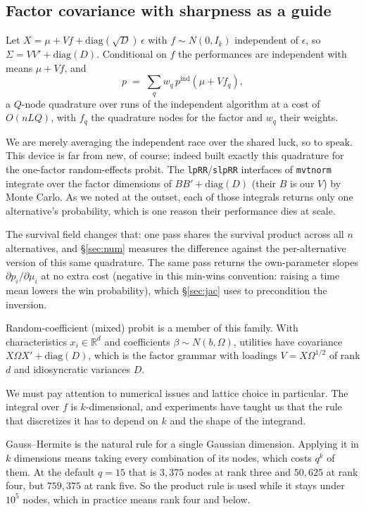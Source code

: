 \documentclass[11pt]{article}
\newcommand{\R}{\mathbb{R}}
\begin{document}
\subsection{Factor covariance with sharpness as a guide}\label{sec:factor}

Let $X=\mu+Vf+\mathrm{diag}(\sqrt D)\,\epsilon$ with $f\sim N(0,I_k)$
independent of $\epsilon$, so $\Sigma=VV'+\mathrm{diag}(D)$. Conditional on $f$
the performances are independent with means $\mu+Vf$, and
\begin{equation}
p \;=\; \sum_q w_q\, p^{\mathrm{ind}}(\mu+Vf_q),
\end{equation}
a $Q$-node quadrature over runs of the independent algorithm at a cost of
$O(nLQ)$, with $f_q$ the quadrature nodes for the factor and $w_q$ their
weights.

We are merely averaging the independent race over the shared luck, so to speak. This device is far from new, of course; indeed
\citet{butler1982} built exactly this quadrature for the one-factor
random-effects probit. The \texttt{lpRR}/\texttt{slpRR} interfaces of
\texttt{mvtnorm} integrate over the factor dimensions of
$BB'+\mathrm{diag}(D)$ (their $B$ is our $V$) by Monte Carlo. As we noted at the outset, each of
those integrals returns only one alternative's probability, which is one
reason their performance dies at scale.

The survival field changes that: one pass shares the survival product across all
$n$ alternatives, and \S\ref{sec:num} measures the difference against the
per-alternative version of this same quadrature. The same pass returns the own-parameter slopes $\partial p_i/\partial\mu_i$
at no extra cost (negative in this min-wins convention: raising a time
mean lowers the win probability), which \S\ref{sec:jac} uses to
precondition the inversion.

Random-coefficient (mixed) probit is a member of this family. With
characteristics $x_i\in\R^{d}$ and coefficients
$\beta\sim N(b,\Omega)$, utilities have covariance
$X\Omega X'+\mathrm{diag}(D)$, which is the factor grammar with loadings
$V=X\Omega^{1/2}$ of rank $d$ and idiosyncratic variances $D$.

We must pay attention to numerical issues and lattice choice in particular. The integral over $f$ is $k$-dimensional, and experiments have taught us that the rule that discretizes it
has to depend on $k$ and the shape of the integrand.

Gauss--Hermite is the natural rule for a single Gaussian dimension.
Applying it in $k$ dimensions means taking every combination of its
nodes, which costs $q^{k}$ of them. At the default $q=15$ that is
$3{,}375$ nodes at rank three and $50{,}625$ at rank four, but
$759{,}375$ at rank five. So the product rule is used while it stays
under $10^{5}$ nodes, which in practice means rank four and below.
\end{document}
